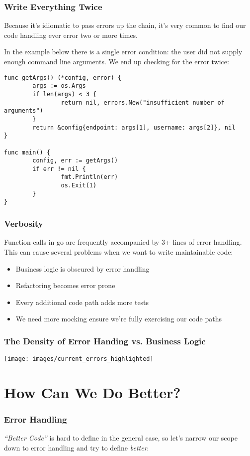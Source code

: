\documentclass{beamer}
\begin{document}
\begin{frame}[fragile]
  \frametitle{Write Everything Twice}
  Because it's idiomatic to pass errors up the chain, it's very common
  to find our code handling ever error two or more times.

  In the example below there is a single error condition: the user did
  not supply enough command line arguments. We end up checking for the
  error twice:
  \par\pause
\begin{lstlisting}[language=Golang]
func getArgs() (*config, error) {
        args := os.Args
        if len(args) < 3 {
                return nil, errors.New("insufficient number of arguments")
        }
        return &config{endpoint: args[1], username: args[2]}, nil
}

func main() {
        config, err := getArgs()
        if err != nil {
                fmt.Println(err)
                os.Exit(1)
        }
}
\end{lstlisting}
\end{frame}

\begin{frame}
  \frametitle{Verbosity}
  Function calls in go are frequently accompanied by 3+ lines of error
  handling. This can cause several problems when we want to write
  maintainable code:
  \par\pause
  \begin{itemize}
  \item Business logic is obscured by error handling
    \pause
  \item Refactoring becomes error prone
    \pause
  \item Every additional code path adds more tests
    \pause
  \item We need more mocking ensure we're fully exercising our code paths
  \end{itemize}
\end{frame}

\begin{frame}
  \frametitle{The Density of Error Handing vs. Business Logic}
  \begin{center}
    \texttt{[image: images/current\_errors\_highlighted]}
  \end{center}
\end{frame}

\section{How Can We Do Better?}
\begin{frame}
  \frametitle{Error Handling}
  {\it ``Better Code''} is hard to define in the general case, so let's
  narrow our scope down to error handling and try to define
  {\it better}.
\end{frame}
\end{document}

